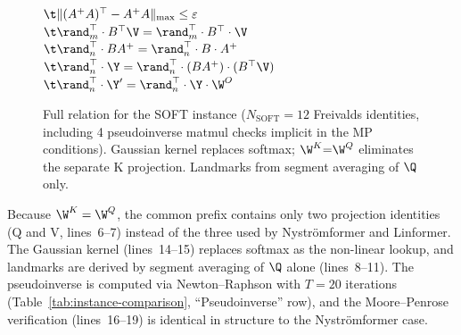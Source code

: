 \begin{figure}[!t]
{{        $\t \lVert (A^+ A)^\top - A^+ A \rVert_{\max} \leq \varepsilon$ \\
        $\t \rand_m^\top \cdot B^{\top}\V = \rand_m^\top \cdot B^{\top} \cdot \V$ \\
        $\t \rand_n^\top \cdot B A^{+} = \rand_n^\top \cdot B \cdot A^+$ \\
        $\t \rand_n^\top \cdot \Y = \rand_n^\top \cdot (B A^{+}) \cdot (B^{\top}\V)$ \\
        $\t \rand_n^\top \cdot \Y' = \rand_n^\top \cdot \Y \cdot \W^O$
}}
\caption{Full relation for the SOFT instance ($N_{\text{SOFT}}{=}12$ Freivalds identities, including 4 pseudoinverse matmul checks implicit in the MP conditions). Gaussian kernel replaces softmax; $\W^K{=}\W^Q$ eliminates the separate K projection. Landmarks from segment averaging of $\Q$ only.}
\label{fig:relation-soft}
\end{figure}

Because $\W^K = \W^Q$, the common prefix contains only two projection identities (Q and V, lines~6--7) instead of the three used by Nystr\"{o}mformer and Linformer. The Gaussian kernel (lines~14--15) replaces softmax as the non-linear lookup, and landmarks are derived by segment averaging of $\Q$ alone (lines~8--11). The pseudoinverse is computed via Newton--Raphson with $T{=}20$ iterations (Table~\ref{tab:instance-comparison}, ``Pseudoinverse'' row), and the Moore--Penrose verification (lines~16--19) is identical in structure to the Nystr\"{o}mformer case.

\begin{table}[!t]
\centering
\caption{Summary of the three supported low-rank attention instances. $N_{\mathcal{I}}$ counts all Freivalds-projected identities including Q/K/V and output projection checks as well as the pseudoinverse verification matmuls (4 per pseudoinverse, verifying the intermediate products used in the MP element-wise checks).}
\label{tab:instance-comparison}
\end{table}
